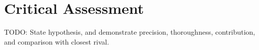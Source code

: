 \chapter{Critical Assessment}

TODO: State hypothesis, and demonstrate precision, thoroughness, contribution, and comparison with closest rival.